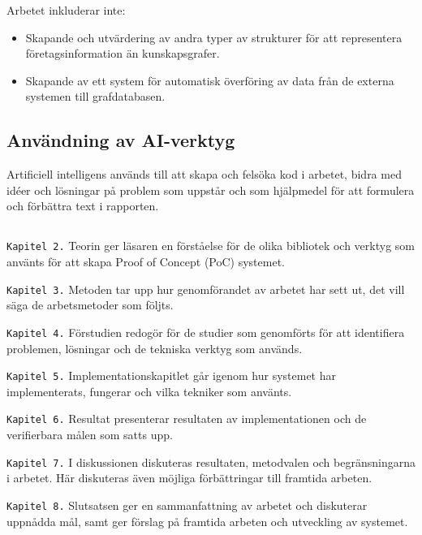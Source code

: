 Arbetet inkluderar inte:
\begin{itemize}
  \item{Skapande och utvärdering av andra typer av strukturer för att representera företagsinformation än kunskapsgrafer.}
  \item{Skapande av ett system för automatisk överföring av data från de externa systemen till grafdatabasen.}
\end{itemize}

\subsection{Användning av AI-verktyg}
Artificiell intelligens används till att skapa och felsöka kod i arbetet, bidra med idéer och lösningar på problem som uppstår och som hjälpmedel för att formulera och förbättra text i rapporten.


\subsection{}\label{subsec:outline}
\noindent

\texttt{Kapitel 2.} Teorin ger läsaren en förståelse för de olika bibliotek och verktyg som använts för att skapa Proof of Concept (PoC) systemet.

\texttt{Kapitel 3.} Metoden tar upp hur genomförandet av arbetet har sett ut, det vill säga de arbetsmetoder som följts.

\texttt{Kapitel 4.} Förstudien redogör för de studier som genomförts för att identifiera problemen, lösningar och de tekniska verktyg som används.

\texttt{Kapitel 5.} Implementationskapitlet går igenom hur systemet har implementerats, fungerar och vilka tekniker som använts.

\texttt{Kapitel 6.} Resultat presenterar resultaten av implementationen och de verifierbara målen som satts upp.

\texttt{Kapitel 7.} I diskussionen diskuteras resultaten, metodvalen och begränsningarna i arbetet. Här diskuteras även möjliga förbättringar till framtida arbeten.

\texttt{Kapitel 8.} Slutsatsen ger en sammanfattning av arbetet och diskuterar uppnådda mål, samt ger förslag på framtida arbeten och utveckling av systemet.

